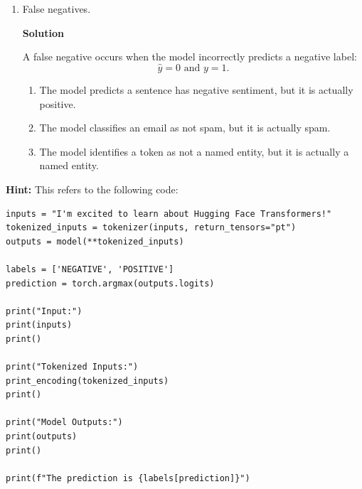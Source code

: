 \documentclass[10pt]{article}
\begin{document}
\begin{enumerate}[label=\roman*.]
    \item False negatives.
    
    \textbf{Solution}
    
    A false negative occurs when the model incorrectly predicts a negative label:
    \[
    \hat{y} = 0 \text{ and } y = 1.
    \]
    
    \begin{enumerate}
    	\item The model predicts a sentence has negative sentiment, but it is actually positive.
    	\item The model classifies an email as not spam, but it is actually spam.
    	\item The model identifies a token as not a named entity, but it is actually a named entity.
    \end{enumerate}
    
\end{enumerate}

\textbf{Hint:} This refers to the following code:

\begin{lstlisting}
inputs = "I'm excited to learn about Hugging Face Transformers!"
tokenized_inputs = tokenizer(inputs, return_tensors="pt")
outputs = model(**tokenized_inputs)

labels = ['NEGATIVE', 'POSITIVE']
prediction = torch.argmax(outputs.logits)

print("Input:")
print(inputs)
print()

print("Tokenized Inputs:")
print_encoding(tokenized_inputs)
print()

print("Model Outputs:")
print(outputs)
print()

print(f"The prediction is {labels[prediction]}")
\end{lstlisting}
\end{document}
